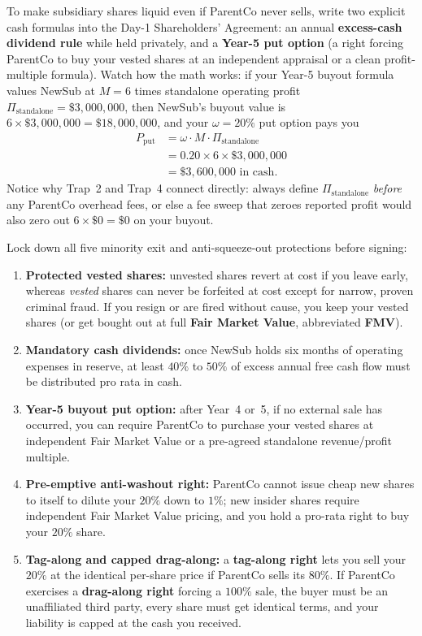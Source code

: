\begin{happeningbox}
To make subsidiary shares liquid even if ParentCo never sells, write two explicit cash formulas into the Day-1 Shareholders' Agreement: an annual \textbf{excess-cash dividend rule} while held privately, and a \textbf{Year-5 put option} (a right forcing ParentCo to buy your vested shares at an independent appraisal or a clean profit-multiple formula). Watch how the math works: if your Year-5 buyout formula values NewSub at $M = 6$ times standalone operating profit $\Pi_{\text{standalone}} = \$3{,}000{,}000$, then NewSub's buyout value is $6 \times \$3{,}000{,}000 = \$18{,}000{,}000$, and your $\omega = 20\%$ put option pays you
\begin{align*}
  P_{\text{put}} &= \omega \cdot M \cdot \Pi_{\text{standalone}} \\
  &= 0.20 \times 6 \times \$3{,}000{,}000 \\
  &= \$3{,}600{,}000 \text{ in cash.}
\end{align*}
Notice why Trap~2 and Trap~4 connect directly: always define $\Pi_{\text{standalone}}$ \emph{before} any ParentCo overhead fees, or else a fee sweep that zeroes reported profit would also zero out $6 \times \$0 = \$0$ on your buyout.
\end{happeningbox}

Lock down all five minority exit and anti-squeeze-out protections before signing:
\begin{enumerate}
  \item \textbf{Protected vested shares:} unvested shares revert at cost if you leave early, whereas \emph{vested} shares can never be forfeited at cost except for narrow, proven criminal fraud. If you resign or are fired without cause, you keep your vested shares (or get bought out at full \textbf{Fair Market Value}, abbreviated \textbf{FMV}).
  \item \textbf{Mandatory cash dividends:} once NewSub holds six months of operating expenses in reserve, at least $40\%$ to $50\%$ of excess annual free cash flow must be distributed pro rata in cash.
  \item \textbf{Year-5 buyout put option:} after Year~4 or~5, if no external sale has occurred, you can require ParentCo to purchase your vested shares at independent Fair Market Value or a pre-agreed standalone revenue/profit multiple.
  \item \textbf{Pre-emptive anti-washout right:} ParentCo cannot issue cheap new shares to itself to dilute your $20\%$ down to $1\%$; new insider shares require independent Fair Market Value pricing, and you hold a pro-rata right to buy your $20\%$ share.
  \item \textbf{Tag-along and capped drag-along:} a \textbf{tag-along right} lets you sell your $20\%$ at the identical per-share price if ParentCo sells its $80\%$. If ParentCo exercises a \textbf{drag-along right} forcing a $100\%$ sale, the buyer must be an unaffiliated third party, every share must get identical terms, and your liability is capped at the cash you received.
\end{enumerate}

